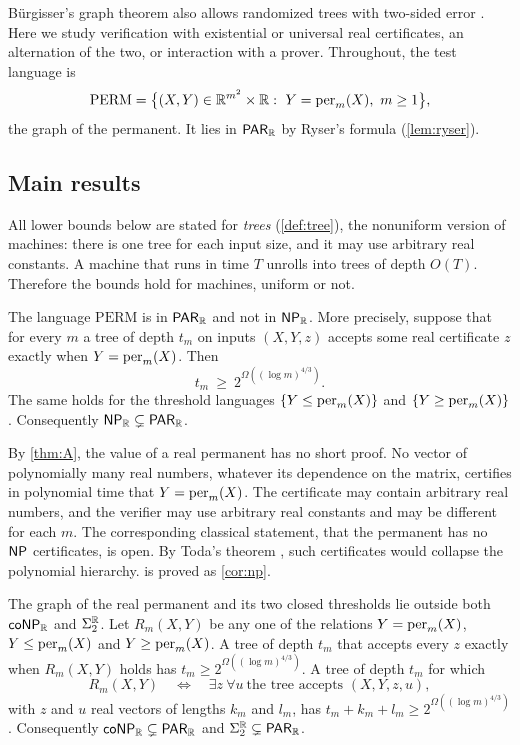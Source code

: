 B\"urgisser's graph theorem also allows randomized trees with two-sided error \cite[Corollary~1.5]{Bur04}. Here we study verification with existential or universal real certificates, an alternation of the two, or interaction with a prover. Throughout, the test language is
\[
\mathrm{PERM}=\bigl\{(X,Y)\in\RR^{m^2}\times\RR:\ Y=\per_m(X),\ m\ge1\bigr\},
\]
the graph of the permanent. It lies in $\textsf{\upshape PAR}_{\mathbb{R}}$ by Ryser's formula (\cref{lem:ryser}).

\subsection{Main results}

All lower bounds below are stated for \emph{trees} (\cref{def:tree}), the nonuniform version of machines: there is one tree for each input size, and it may use arbitrary real constants. A machine that runs in time $T$ unrolls into trees of depth $O(T)$. Therefore the bounds hold for machines, uniform or not.

\begin{maintheorem}[$\NPR\ne\PARR$]\label{thm:A}
The language $\mathrm{PERM}$ is in $\textsf{\upshape PAR}_{\mathbb{R}}$ and not in $\textsf{\upshape NP}_{\mathbb{R}}$. More precisely, suppose that for every $m$ a tree of depth $t_m$ on inputs $(X,Y,z)$ accepts some real certificate $z$ exactly when $Y=\operatorname{per}_m(X)$. Then
\[
t_m\ \ge\ 2^{\Omega((\log m)^{4/3})} .
\]
The same holds for the threshold languages $\{Y\le\operatorname{per}_m(X)\}$ and $\{Y\ge\operatorname{per}_m(X)\}$. Consequently $\textsf{\upshape NP}_{\mathbb{R}}\subsetneq\textsf{\upshape PAR}_{\mathbb{R}}$.
\end{maintheorem}

By \cref{thm:A}, the value of a real permanent has no short proof. No vector of polynomially many real numbers, whatever its dependence on the matrix, certifies in polynomial time that $Y=\operatorname{per}_m(X)$. The certificate may contain arbitrary real numbers, and the verifier may use arbitrary real constants and may be different for each $m$. The corresponding classical statement, that the permanent has no $\textsf{\upshape NP}$ certificates, is open. By Toda's theorem \cite{Tod91}, such certificates would collapse the polynomial hierarchy.  is proved as \cref{cor:np}.

\begin{maintheorem}\label{thm:B}
The graph of the real permanent and its two closed thresholds lie outside both $\textsf{\upshape coNP}_{\mathbb{R}}$ and $\Sigma_2^{\mathbb{R}}$. Let $R_m(X,Y)$ be any one of the relations $Y=\operatorname{per}_m(X)$, $Y\le\operatorname{per}_m(X)$ and $Y\ge\operatorname{per}_m(X)$. A tree of depth $t_m$ that accepts every $z$ exactly when $R_m(X,Y)$ holds has $t_m\ge2^{\Omega((\log m)^{4/3})}$. A tree of depth $t_m$ for which
\[
R_m(X,Y)\quad\Longleftrightarrow\quad\exists z\ \forall u\ \text{the tree accepts }(X,Y,z,u),
\]
with $z$ and $u$ real vectors of lengths $k_m$ and $l_m$, has $t_m+k_m+l_m\ge2^{\Omega((\log m)^{4/3})}$. Consequently $\textsf{\upshape coNP}_{\mathbb{R}}\subsetneq\textsf{\upshape PAR}_{\mathbb{R}}$ and $\Sigma_2^{\mathbb{R}}\subsetneq\textsf{\upshape PAR}_{\mathbb{R}}$.
\end{maintheorem}

